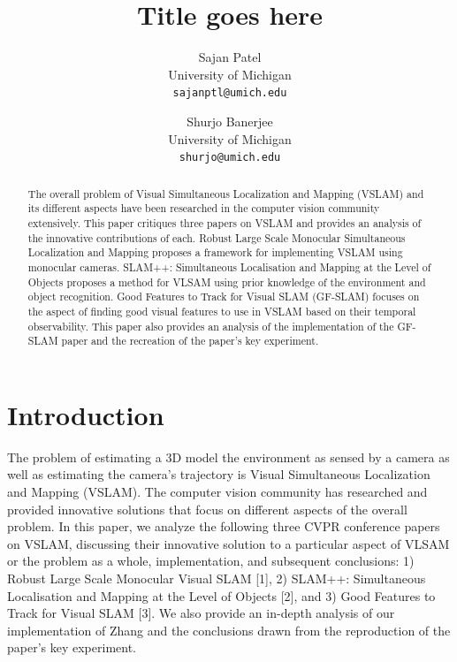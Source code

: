 \documentclass[10pt,twocolumn,letterpaper]{article}
\begin{document}
\title{Title goes here}

\author{Sajan Patel\\
University of Michigan\\
{\tt\small sajanptl@umich.edu}
\and
Shurjo Banerjee\\
University of Michigan\\
{\tt\small shurjo@umich.edu}
}

\maketitle

\begin{abstract}
The overall problem of Visual Simultaneous Localization and Mapping (VSLAM) and its different aspects have 
been researched in the computer vision community extensively. This paper critiques three papers on VSLAM 
and provides an analysis of the innovative contributions of each. Robust Large Scale Monocular Simultaneous Localization and Mapping proposes a framework for implementing VSLAM using monocular cameras. SLAM++: Simultaneous Localisation and Mapping at the Level of Objects proposes a method for VLSAM using prior knowledge of the environment and object recognition. Good Features to Track for Visual SLAM (GF-SLAM) focuses on the aspect of finding good visual features to use in VSLAM based on their temporal observability. This paper also provides an analysis of the implementation of the GF-SLAM paper and the recreation of the paper's key experiment.
\end{abstract}

\section{Introduction}
The problem of estimating a 3D model the environment as sensed by a camera as well as estimating the 
camera's trajectory is Visual Simultaneous Localization and Mapping (VSLAM).  The computer vision community has researched 
and provided innovative solutions that focus on different aspects of the overall problem. In this paper, we analyze the following three CVPR conference papers on VSLAM, discussing their innovative solution to a particular aspect of VLSAM or the problem as a whole, implementation, and subsequent conclusions: 
1) Robust Large Scale Monocular Visual SLAM [1], 
2) SLAM++: Simultaneous Localisation and Mapping at the Level of Objects [2], and 
3) Good Features to Track for Visual SLAM [3]. We also provide an in-depth analysis of our implementation of Zhang \etal [3] and the conclusions drawn from the reproduction of the paper's key experiment.
\end{document}
